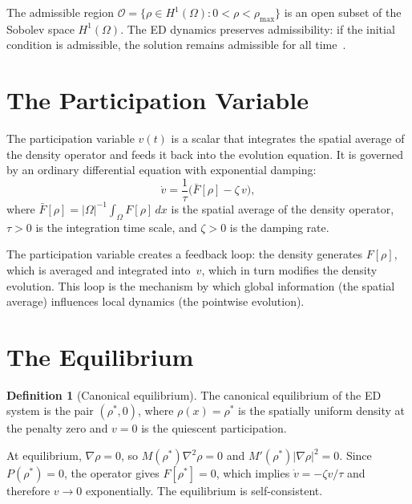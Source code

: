 \documentclass[11pt,twoside,openright]{book}
\theoremstyle{definition}
\newtheorem{definition}{Definition}[chapter]
\theoremstyle{plain}
\theoremstyle{definition}
\theoremstyle{remark}
\newcommand{\rhomax}{\rho_{\max}}
\newcommand{\rhostar}{\rho^{*}}
\newcommand{\Fop}{F[\rho]}
\newcommand{\Fbar}{\bar{F}[\rho]}
\begin{document}
The admissible region \(\mathcal{O} = \{\rho \in H^1(\Omega) : 0 < \rho < \rhomax\}\) is an open subset of the Sobolev space \(H^1(\Omega)\). The ED dynamics preserves admissibility: if the initial condition is admissible, the solution remains admissible for all time~\cite{rigour}.

\section{The Participation Variable}\label{sec:participation}

The participation variable \(v(t)\) is a scalar that integrates the spatial average of the density operator and feeds it back into the evolution equation. It is governed by an ordinary differential equation with exponential damping:
\begin{equation}\label{eq:participation}
\dot{v} = \frac{1}{\tau}\bigl(\Fbar - \zeta\,v\bigr),
\end{equation}
where \(\Fbar = |\Omega|^{-1}\int_\Omega \Fop\,dx\) is the spatial average of the density operator, \(\tau > 0\) is the integration time scale, and \(\zeta > 0\) is the damping rate.

The participation variable creates a feedback loop: the density generates \(\Fop\), which is averaged and integrated into~\(v\), which in turn modifies the density evolution. This loop is the mechanism by which global information (the spatial average) influences local dynamics (the pointwise evolution).

\section{The Equilibrium}\label{sec:equilibrium}

\begin{definition}[Canonical equilibrium]\label{def:equilibrium}
The canonical equilibrium of the ED system is the pair \((\rhostar, 0)\), where \(\rho(x) = \rhostar\) is the spatially uniform density at the penalty zero and \(v = 0\) is the quiescent participation.
\end{definition}

At equilibrium, \(\nabla\rho = 0\), so \(M(\rhostar)\nabla^2\rho = 0\) and \(M'(\rhostar)|\nabla\rho|^2 = 0\). Since \(P(\rhostar) = 0\), the operator gives \(F[\rhostar] = 0\), which implies \(\dot{v} = -\zeta v/\tau\) and therefore \(v \to 0\) exponentially. The equilibrium is self-consistent.


\end{document}
